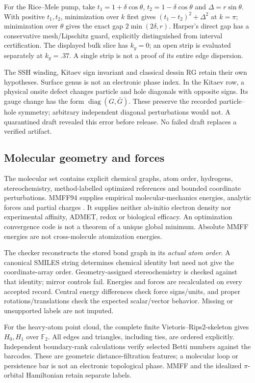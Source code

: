 For the Rice--Mele pump, take
$t_1=1+\delta\cos\theta$, $t_2=1-\delta\cos\theta$ and
$\Delta=r\sin\theta$. With positive $t_1,t_2$, minimization over $k$ first
gives $(t_1-t_2)^2+\Delta^2$ at $k=\pi$; minimization over $\theta$ gives
the exact gap $2\min(2\delta,r)$. Harper's direct gap has a conservative
mesh/Lipschitz guard, explicitly distinguished from interval certification.
The displayed bulk slice has $k_y=0$; an open strip is evaluated separately at
$k_y=.37$. A single strip is not a proof of its entire edge dispersion.

The SSH winding, Kitaev sign invariant and classical dessin RG retain their
own hypotheses. Surface genus is not an electronic phase index. In the
Kitaev row, a physical onsite defect changes particle and hole diagonals with
opposite signs. Its gauge change has the form $\operatorname{diag}(G,\bar G)$.
These preserve the recorded particle--hole symmetry; arbitrary independent
diagonal perturbations would not. A quarantined draft revealed this error
before release. No failed draft replaces a verified artifact.

\subsection{Molecular geometry and forces}
The molecular set contains explicit chemical graphs, atom order, hydrogens,
stereochemistry, method-labelled optimized references and bounded coordinate
perturbations. MMFF94 supplies empirical molecular-mechanics energies, analytic
forces and partial charges \cite{DSRDKit}. It supplies neither ab-initio
electron density nor experimental affinity, ADMET, redox or biological efficacy.
An optimization convergence code is not a theorem of a unique global minimum.
Absolute MMFF energies are not cross-molecule atomization energies.

The checker reconstructs the stored bond graph in its \emph{actual atom order}.
A canonical SMILES string determines chemical identity but need not give the
coordinate-array order. Geometry-assigned stereochemistry is checked against
that identity; mirror controls fail. Energies and forces are recalculated on
every accepted record. Central energy differences check force signs/units,
and proper rotations/translations check the expected scalar/vector behavior.
Missing or unsupported labels are not imputed.

For the heavy-atom point cloud, the complete finite Vietoris--Rips2-skeleton
gives $H_0,H_1$ over $\mathbb F_2$. All edges and triangles, including ties,
are ordered explicitly. Independent boundary-rank calculations verify selected
Betti numbers against the barcodes. These are geometric distance-filtration
features; a molecular loop or persistence bar is not an electronic topological
phase. MMFF and the idealized $\pi$-orbital Hamiltonian retain separate labels.


